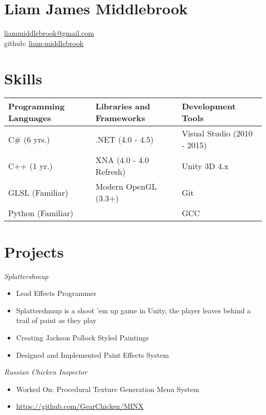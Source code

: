\documentclass[line,margin]{res}
\begin{document}
\marginsize{.5in}{.5in}{1.0in}{.5in}

\section{Liam James Middlebrook}

\href{mailto:liammiddlebrook@gmail.com}{liammiddlebrook@gmail.com}\\
github: \href{https://github.com/liam-middlebrook}{liam-middlebrook}

\begin{resume}


\section{Skills}
\begin{table}[h]
\begin{tabular}{@{}lll@{}}
\toprule
Programming Languages & Libraries and Frameworks & Development Tools           \\ \midrule
C\# (6 yrs.)          & .NET (4.0 - 4.5)         & Visual Studio (2010 - 2015) \\
C++ (1 yr.)           & XNA (4.0 - 4.0 Refresh)  & Unity 3D 4.x                \\
GLSL (Familiar)       & Modern OpenGL (3.3+)     & Git                         \\
Python (Familiar)     &                          & GCC                         \\ \bottomrule
\end{tabular}
\end{table}
\section{Projects}


{\sl Splattershmup}
\begin{itemize}
\itemsep1pt\parskip0pt
\item
Lead Effects Programmer
\item
Splattershmup is a shoot 'em up game in Unity, the player leaves behind a trail of paint as they play
\item
Creating Jackson Pollock Styled Paintings
\item
Designed and Implemented Paint Effects System
\end{itemize}

{\sl Russian Chicken
Inspector}
\begin{itemize}
\itemsep1pt\parskip0pt
\item
Worked On:
\subitem
Procedural Texture Generation
\subitem
Menu System
\item
\url {https://github.com/GearChicken/MINX}
\end{itemize}


\end{resume}
\end{document}
